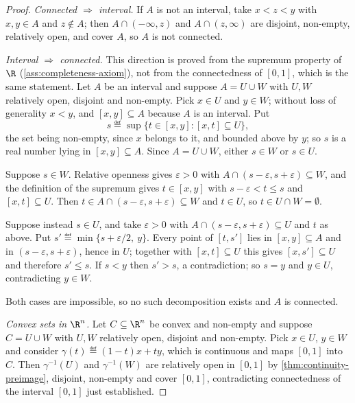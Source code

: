 \begin{proof}
	\emph{Connected $\Rightarrow$ interval.} If $A$ is not an interval, take
	$x<z<y$ with $x,y\in A$ and $z\notin A$; then $A\cap(-\infty,z)$ and
	$A\cap(z,\infty)$ are disjoint, non-empty, relatively open, and cover $A$, so
	$A$ is not connected.

	\emph{Interval $\Rightarrow$ connected.} This direction is proved from the
	supremum property of $\R$ (\autoref{ass:completeness-axiom}), not from the
	connectedness of $[0,1]$, which is the same statement. Let $A$ be an interval
	and suppose $A=U\cup W$ with $U,W$ relatively open, disjoint and non-empty. Pick
	$x\in U$ and $y\in W$; without loss of generality $x<y$, and $[x,y]\subseteq A$
	because $A$ is an interval. Put
	\[
		s\eqdef\sup\bigl\{t\in[x,y] : [x,t]\subseteq U\bigr\},
	\]
	the set being non-empty, since $x$ belongs to it, and bounded above by $y$; so
	$s$ is a real number lying in $[x,y]\subseteq A$. Since $A=U\cup W$, either
	$s\in W$ or $s\in U$.

	Suppose $s\in W$. Relative openness gives $\varepsilon>0$ with
	$A\cap(s-\varepsilon,s+\varepsilon)\subseteq W$, and the definition of the
	supremum gives $t\in[x,y]$ with $s-\varepsilon<t\leq s$ and $[x,t]\subseteq U$.
	Then $t\in A\cap(s-\varepsilon,s+\varepsilon)\subseteq W$ and $t\in U$, so
	$t\in U\cap W=\emptyset$.

	Suppose instead $s\in U$, and take $\varepsilon>0$ with
	$A\cap(s-\varepsilon,s+\varepsilon)\subseteq U$ and $t$ as above. Put
	$s'\eqdef\min\{s+\varepsilon/2,\ y\}$. Every point of $[t,s']$ lies in
	$[x,y]\subseteq A$ and in $(s-\varepsilon,s+\varepsilon)$, hence in $U$;
	together with $[x,t]\subseteq U$ this gives $[x,s']\subseteq U$ and therefore
	$s'\leq s$. If $s<y$ then $s'>s$, a contradiction; so $s=y$ and $y\in U$,
	contradicting $y\in W$.

	Both cases are impossible, so no such decomposition exists and $A$ is
	connected.

	\emph{Convex sets in $\R^n$.} Let $C\subseteq\R^n$ be convex and non-empty and
	suppose $C=U\cup W$ with $U,W$ relatively open, disjoint and non-empty. Pick
	$x\in U$, $y\in W$ and consider $\gamma(t)\eqdef(1-t)x+ty$, which is continuous
	and maps $[0,1]$ into $C$. Then $\gamma^{-1}(U)$ and $\gamma^{-1}(W)$ are
	relatively open in $[0,1]$ by \autoref{thm:continuity-preimage}, disjoint,
	non-empty and cover $[0,1]$, contradicting connectedness of the interval
	$[0,1]$ just established.
\end{proof}

